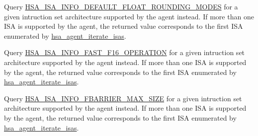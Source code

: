 \begin{DoxyRefList}
\item[Member \mbox{\hyperlink{group__agentinfo_gga39d0684207d95717d96319573b3e4a42aa43711135cff370be22a717d0cae97e5}{HSA\+\_\+\+AGENT\+\_\+\+INFO\+\_\+\+DEFAULT\+\_\+\+FLOAT\+\_\+\+ROUNDING\+\_\+\+MODE}} ]\label{deprecated__deprecated000061}%
%
Query \mbox{\hyperlink{group__instruction-set-architecture_ggaa8a09719dffad53bb3908b11ed25c1e4a2b3ecf16a9ab3b3ad54737231c65597f}{HSA\+\_\+\+ISA\+\_\+\+INFO\+\_\+\+DEFAULT\+\_\+\+FLOAT\+\_\+\+ROUNDING\+\_\+\+MODES}} for a given intruction set architecture supported by the agent instead. If more than one ISA is supported by the agent, the returned value corresponds to the first ISA enumerated by \mbox{\hyperlink{group__instruction-set-architecture_gaa624c390f2cfec064bc1b4d9c9303ed4}{hsa\+\_\+agent\+\_\+iterate\+\_\+isas}}. 
\item[Member \mbox{\hyperlink{group__agentinfo_gga39d0684207d95717d96319573b3e4a42a24a0540e814290a4058700bab43cc321}{HSA\+\_\+\+AGENT\+\_\+\+INFO\+\_\+\+FAST\+\_\+\+F16\+\_\+\+OPERATION}} ]\label{deprecated__deprecated000063}%
%
Query \mbox{\hyperlink{group__instruction-set-architecture_ggaa8a09719dffad53bb3908b11ed25c1e4a25ea781e5bf0e215df3852f99f509a81}{HSA\+\_\+\+ISA\+\_\+\+INFO\+\_\+\+FAST\+\_\+\+F16\+\_\+\+OPERATION}} for a given intruction set architecture supported by the agent instead. If more than one ISA is supported by the agent, the returned value corresponds to the first ISA enumerated by \mbox{\hyperlink{group__instruction-set-architecture_gaa624c390f2cfec064bc1b4d9c9303ed4}{hsa\+\_\+agent\+\_\+iterate\+\_\+isas}}. 
\item[Member \mbox{\hyperlink{group__agentinfo_gga39d0684207d95717d96319573b3e4a42a81f9780e49dd38b4f836289fd3647bad}{HSA\+\_\+\+AGENT\+\_\+\+INFO\+\_\+\+FBARRIER\+\_\+\+MAX\+\_\+\+SIZE}} ]\label{deprecated__deprecated000069}%
%
Query \mbox{\hyperlink{group__instruction-set-architecture_ggaa8a09719dffad53bb3908b11ed25c1e4aa0679ff582693a037b5523330ed25e3f}{HSA\+\_\+\+ISA\+\_\+\+INFO\+\_\+\+FBARRIER\+\_\+\+MAX\+\_\+\+SIZE}} for a given intruction set architecture supported by the agent instead. If more than one ISA is supported by the agent, the returned value corresponds to the first ISA enumerated by \mbox{\hyperlink{group__instruction-set-architecture_gaa624c390f2cfec064bc1b4d9c9303ed4}{hsa\+\_\+agent\+\_\+iterate\+\_\+isas}}. 
\item[Member \mbox{\hyperlink{group__agentinfo_gga39d0684207d95717d96319573b3e4a42a512597f1fd2c2e6baee29f364ccd924f}{HSA\+\_\+\+AGENT\+\_\+\+INFO\+\_\+\+GRID\+\_\+\+MAX\+\_\+\+DIM}} ]\label{deprecated__deprecated000067}%

\end{DoxyRefList}
